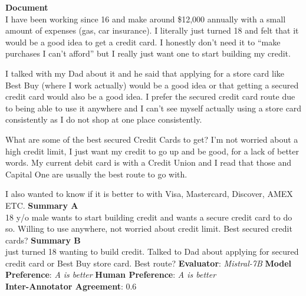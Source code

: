 \begin{tcolorbox}[colback=white,colframe=black!75!white,colbacktitle=black!75!white,title=Summarization Example 2]
  \textbf{Document} \\
  I have been working since 16 and make around \$12,000 annually with a small amount of expenses (gas, car insurance). I literally just turned 18 and felt that it would be a good idea to get a credit card. I honestly don't need it to ``make purchases I can't afford'' but I really just want one to start building my credit.
  
  I talked with my Dad about it and he said that applying for a store card like Best Buy (where I work actually) would be a good idea or that getting a secured credit card would also be a good idea. I prefer the secured credit card route due to being able to use it anywhere and I can't see myself actually using a store card consistently as I do not shop at one place consistently.
  
  What are some of the best secured Credit Cards to get? I'm not worried about a high credit limit, I just want my credit to go up and be good, for a lack of better words. My current debit card is with a Credit Union and I read that those and Capital One are usually the best route to go with.
  
  I also wanted to know if it is better to with Visa, Mastercard, Discover, AMEX ETC.
  \tcbline
  \textbf{Summary A} \\
  18 y/o male wants to start building credit and wants a secure credit card to do so. Willing to use anywhere, not worried about credit limit. Best secured credit cards?
  \tcbline
  \textbf{Summary B} \\
  just turned 18 wanting to build credit. Talked to Dad about applying for secured credit card or Best Buy store card. Best route?
  \tcbline
  \textbf{Evaluator}: \textit{Mistral-7B} \quad \textbf{Model Preference}: \textit{A is better} \quad \textbf{Human Preference}: \textit{A is better}\\
  \textbf{Inter-Annotator Agreement}: $0.6$
\end{tcolorbox}


